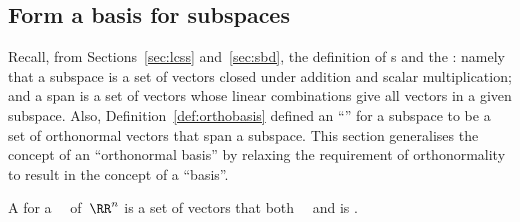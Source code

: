 \subsection{Form a basis for subspaces}


Recall, from Sections~\ref{sec:lcss} and~\ref{sec:sbd}, the definition of s and the : namely that a subspace is a set of vectors closed under addition and scalar multiplication; and a span is a set of vectors whose linear combinations give all vectors in a given subspace.
Also, Definition~\ref{def:orthobasis} defined an ``'' for a subspace to be a set of orthonormal vectors that span a subspace.
This section generalises the concept of an ``orthonormal basis'' by relaxing the requirement of orthonormality to result in the concept of a ``basis''.


\begin{definition} \label{def:basis} 
A  for a ~\WW\ of~\(\RR^n\) is a set of  vectors that both ~\WW\ and is .
\end{definition}

